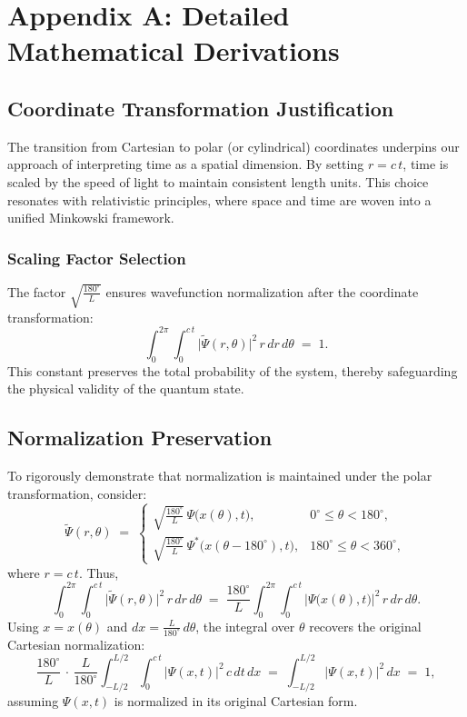 
\section{Appendix A: Detailed Mathematical Derivations}
\label{appendix:A}

\subsection{Coordinate Transformation Justification}
The transition from Cartesian to polar (or cylindrical) coordinates underpins our approach of interpreting time as a spatial dimension. By setting \( r = c\,t \), time is scaled by the speed of light to maintain consistent length units. This choice resonates with relativistic principles, where space and time are woven into a unified Minkowski framework.

\subsubsection{Scaling Factor Selection}
The factor \(\sqrt{\frac{180^\circ}{L}}\) ensures wavefunction normalization after the coordinate transformation:
\[
\int_{0}^{2\pi} \int_{0}^{c\,t} \bigl|\tilde{\Psi}(r,\theta)\bigr|^2 \,r\,dr\,d\theta \;=\; 1.
\]
This constant preserves the total probability of the system, thereby safeguarding the physical validity of the quantum state.

\subsection{Normalization Preservation}
To rigorously demonstrate that normalization is maintained under the polar transformation, consider:
\[
\tilde{\Psi}(r, \theta) \;=\;
\begin{cases}
\sqrt{\frac{180^\circ}{L}} \,\Psi\bigl(x(\theta), t\bigr), & 0^\circ \le \theta < 180^\circ, \\[6pt]
\sqrt{\frac{180^\circ}{L}} \,\Psi^*\bigl(x(\theta - 180^\circ), t\bigr), & 180^\circ \le \theta < 360^\circ,
\end{cases}
\]
where \(r = c\,t\). Thus,
\[
\int_{0}^{2\pi} \!\int_{0}^{c\,t} \bigl|\tilde{\Psi}(r,\theta)\bigr|^2 \,r\,dr\,d\theta
\;=\;
\frac{180^\circ}{L}
\int_{0}^{2\pi} \!\int_{0}^{c\,t}
\bigl|\Psi\bigl(x(\theta), t\bigr)\bigr|^2 \,r\,dr\,d\theta.
\]
Using \(x = x(\theta)\) and \(dx = \tfrac{L}{180^\circ}\,d\theta\), the integral over \(\theta\) recovers the original Cartesian normalization:
\[
\frac{180^\circ}{L} \,\cdot\,\frac{L}{180^\circ}
\int_{-L/2}^{L/2} \!\int_{0}^{c\,t}
\bigl|\Psi(x,t)\bigr|^2 \,c\,dt\,dx
\;=\;
\int_{-L/2}^{L/2} \!\bigl|\Psi(x,t)\bigr|^2\,dx
\;=\; 1,
\]
assuming \(\Psi(x,t)\) is normalized in its original Cartesian form.

